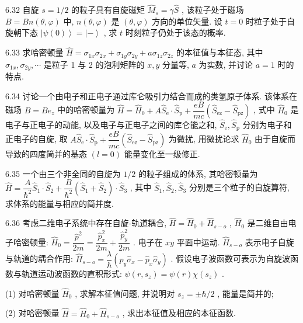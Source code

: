 \vfill\newpage

6.32 自旋 $s = 1 / 2$ 的粒子具有自旋磁矩 $\hat{M}_s = \gamma \hat{S}$ , 该粒子处于磁场 $B = Bn(\theta, \varphi)$ 中, $n(\theta, \varphi)$ 是 $(\theta, \varphi)$ 方向的单位矢量. 设 $t = 0$ 时粒子处于自旋朝下态 $\left|\psi(0)\right\rangle = \left| -\right\rangle$ , 求 $t$ 时刻粒子仍处于该态的概率.

\vfill\newpage

6.33 求哈密顿量 $\hat{H} = \sigma_{1x}\sigma_{2x} + \sigma_{1y}\sigma_{2y} + a\sigma_{1z}\sigma_{2z}$ 的本征值与本征态, 其中 $\sigma_{1x}, \sigma_{2y}, \cdots$ 是粒子 1 与 2 的泡利矩阵的 $x, y$ 分量等, $a$ 为实数, 并讨论 $a = 1$ 时的特点.

\vfill\newpage

6.34 讨论一个由电子和正电子通过库仑吸引力结合而成的类氢原子体系. 该体系在磁场 $B = Be_{z}$ 中的哈密顿量为 $\hat{H} = \hat{H}_{0} + A\hat{S}_{\mathrm{e}} \cdot \hat{S}_{\mathrm{p}} + \dfrac{eB}{mc}\left(\hat{S}_{\mathrm{ez}} - \hat{S}_{\mathrm{pz}}\right)$ , 式中 $\hat{H}_{0}$ 是电子与正电子的动能, 以及电子与正电子之间的库仑能之和, $\hat{S}_{\mathrm{e}}, \hat{S}_{\mathrm{p}}$ 分别为电子和正电子的自旋, 取 $A\hat{S}_{\mathrm{e}} \cdot \hat{S}_{\mathrm{p}} + \dfrac{eB}{mc}\left(\hat{S}_{\mathrm{ez}} - \hat{S}_{\mathrm{pz}}\right)$ 为微扰, 用微扰论求 $\hat{H}_{0}$ 由于自旋而导致的四度简并的基态 $(l = 0)$ 能量变化至一级修正.

\vfill\newpage

6.35 一个由三个非全同的自旋为 $1/2$ 的粒子组成的体系, 其哈密顿量为 $\hat{H} = \dfrac{A}{\hbar^2}\hat{S}_1 \cdot \hat{S}_2 + \dfrac{B}{\hbar^2} (\hat{S}_1 + \hat{S}_2) \cdot \hat{S}_3$ , 其中 $\hat{S}_1, \hat{S}_2, \hat{S}_3$ 分别是三个粒子的自旋算符, 求体系的能量与相应的简并度.

\vfill\newpage

6.36 考虑二维电子系统中存在自旋-轨道耦合, $\hat{H} = \hat{H}_0 + \hat{H}_{s-o}$ , $\hat{H}_0$ 是二维自由电子哈密顿量: $\hat{H}_0 = \dfrac{\hat{p}^2}{2m} = \dfrac{\hat{p}_x^2}{2m} + \dfrac{\hat{p}_y^2}{2m}$ . 电子在 $xy$ 平面中运动. $\hat{H}_{s-o}$ 表示电子自旋与轨道的耦合作用: $\hat{H}_{s-o} = \dfrac{\lambda}{\hbar} (\hat{p}_y \hat{\sigma}_x - \hat{p}_x \hat{\sigma}_y)$ . 假设电子波函数可表示为自旋波函数与轨道运动波函数的直积形式: $\psi(r, s_z) = \psi(r) \chi(s_z)$ . 

(1) 对哈密顿量 $\hat{H}_0$ , 求解本征值问题, 并说明对 $s_z = \pm \hbar / 2$ , 能量是简并的; 

(2) 对哈密顿量 $\hat{H} = \hat{H}_0 + \hat{H}_{s-o}$ , 求出本征值及相应的本征函数.


